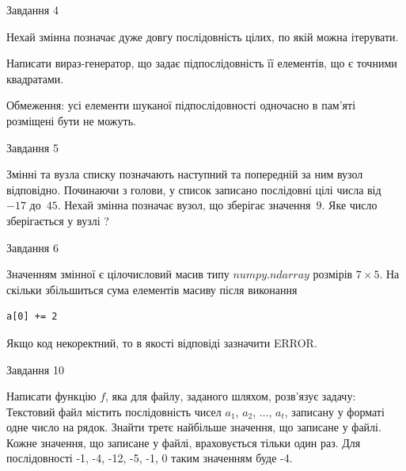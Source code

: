\documentclass[12pt, ukrainian]{article}
\begin{document}
{\begin{minipage}[t]{8.0cm}
\end{minipage}


               
{\begin{center}Завдання {4}\end{center}}
\vspace{-4mm}
Нехай змінна  позначає дуже довгу послідовність цілих, по якій можна ітерувати.

Написати вираз-генератор, що задає підпослідовність її елементів, що є точними квадратами.

Обмеження: усі елементи шуканої підпослідовності одночасно в пам'яті розміщені бути не можуть.\par

\vspace{10mm}
               
{\begin{center}Завдання {5}\end{center}}
\vspace{-4mm}
Змінні  та  вузла списку позначають наступний та попередній за ним вузол відповідно. Починаючи з голови, у список записано послідовні цілі числа від~$-17$ до~$45$. Нехай змінна  позначає вузол, що зберігає значення~$9$.
Яке число зберігається у вузлі  ?\par

               
{\begin{center}Завдання {6}\end{center}}
\vspace{-4mm}
Значенням змінної  є цілочисловий масив типу $numpy.ndarray$ розмірів $7{\times}5$. На скільки збільшиться сума елементів масиву  після виконання
\begin{verbatim}
a[0] += 2
\end{verbatim}


Якщо код некоректний, то в якості відповіді зазначити ERROR.\par

               
{\begin{center}Завдання {10}\end{center}}
\vspace{-4mm}

Написати функцію $f$, яка для файлу, заданого шляхом, розв’язує задачу:\\ Текстовий файл містить послідовність чисел $a_1$, $a_2$, $\ldots$, $a_t$, записану у форматі одне число на рядок. Знайти третє найбільше значення, що записане у файлі. Кожне значення, що записане у файлі, враховується тільки один раз. Для послідовності -1, -4, -12, -5, -1, 0 таким значенням буде -4.

}
\end{document}

